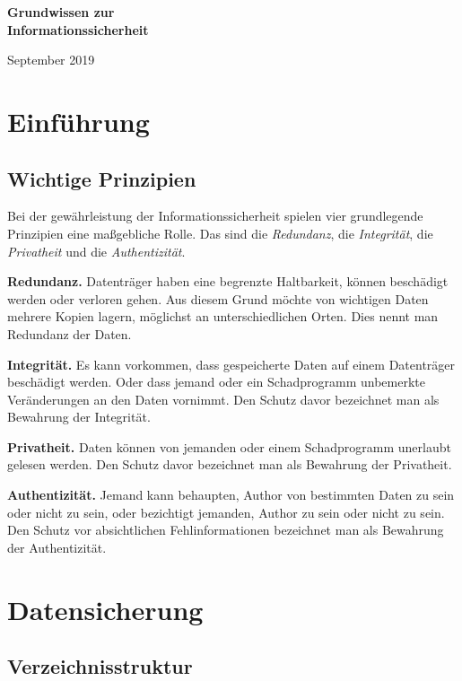 \documentclass[a4paper,11pt,fleqn,twocolumn,twoside]{scrartcl}
\newcommand{\strong}[1]{\textsf{\textbf{#1}}}
\begin{document}
\thispagestyle{empty}

\noindent
{\LARGE\sffamily\bfseries
Grundwissen zur\\
Informationssicherheit\par}

\vspace{1em}\noindent
September 2019

\tableofcontents

\section{Einführung}
\subsection{Wichtige Prinzipien}

Bei der gewährleistung der Informationssicherheit spielen
vier grundlegende Prinzipien eine maßgebliche Rolle.
Das sind die \emph{Redundanz},
die \emph{Integrität}, die \emph{Privatheit} und die
\emph{Authentizität}.

\strong{Redundanz.}
Datenträger haben eine begrenzte Haltbarkeit, können beschädigt werden
oder verloren gehen. Aus diesem Grund möchte von wichtigen Daten
mehrere Kopien lagern, möglichst an unterschiedlichen Orten.
Dies nennt man Redundanz der Daten.

\strong{Integrität.}
Es kann vorkommen, dass gespeicherte Daten auf einem Datenträger
beschädigt werden. Oder dass jemand oder ein Schadprogramm
unbemerkte Veränderungen an den Daten vornimmt. Den Schutz davor
bezeichnet man als Bewahrung der Integrität.

\strong{Privatheit.}
Daten können von jemanden oder einem Schadprogramm unerlaubt
gelesen werden. Den Schutz davor bezeichnet man als
Bewahrung der Privatheit.

\strong{Authentizität.}
Jemand kann behaupten, Author von bestimmten Daten zu sein
oder nicht zu sein, oder bezichtigt jemanden, Author zu sein
oder nicht zu sein. Den Schutz vor absichtlichen Fehlinformationen
bezeichnet man als Bewahrung der Authentizität.

\section{Datensicherung}
\subsection{Verzeichnisstruktur}
\end{document}
